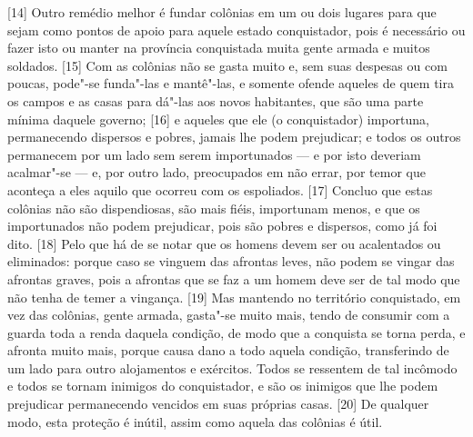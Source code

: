 {[}14{]} Outro remédio melhor é fundar colônias em um ou dois lugares
para que sejam como pontos de apoio para aquele estado conquistador,
pois é necessário ou fazer isto ou manter na província conquistada muita
gente armada e muitos soldados. {[}15{]} Com as colônias não se gasta
muito e, sem suas despesas ou com poucas, pode"-se funda"-las e mantê"-las,
e somente ofende aqueles de quem tira os campos e as casas para dá"-las
aos novos habitantes, que são uma parte mínima daquele governo; {[}16{]}
e aqueles que ele (o conquistador) importuna, permanecendo dispersos e
pobres, jamais lhe podem prejudicar; e todos os outros permanecem por um
lado sem serem importunados --- e por isto deveriam acalmar"-se --- e, por
outro lado, preocupados em não errar, por temor que aconteça a eles
aquilo que ocorreu com os espoliados. {[}17{]} Concluo que estas
colônias não são dispendiosas, são mais fiéis, importunam menos, e que
os importunados não podem prejudicar, pois são pobres e dispersos, como
já foi dito. {[}18{]} Pelo que há de se notar que os homens devem ser ou
acalentados ou eliminados: porque caso se vinguem das afrontas leves,
não podem se vingar das afrontas graves, pois a afrontas que se faz a um
homem deve ser de tal modo que não tenha de temer a vingança. {[}19{]}
Mas mantendo no território conquistado, em vez das colônias, gente
armada, gasta"-se muito mais, tendo de consumir com a guarda toda a renda
daquela condição, de modo que a conquista se torna perda, e afronta
muito mais, porque causa dano a todo aquela condição, transferindo de um
lado para outro alojamentos e exércitos. Todos se ressentem de tal
incômodo e todos se tornam inimigos do conquistador, e são os inimigos
que lhe podem prejudicar permanecendo vencidos em suas próprias casas.
{[}20{]} De qualquer modo, esta proteção é inútil, assim como aquela das
colônias é útil.

